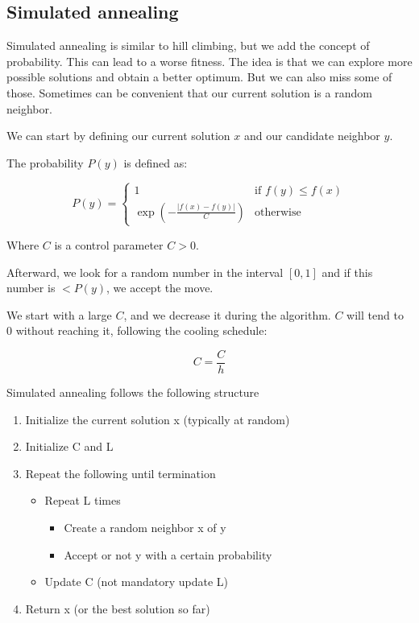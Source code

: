 \subsection{Simulated annealing}

Simulated annealing is similar to hill climbing, but we add the concept of probability. This can lead to a worse fitness. The idea is that we can explore more possible solutions and obtain a better optimum. But we can also miss some of those. Sometimes can be convenient that our current solution is a random neighbor.

\vspace{10pt}

We can start by defining our current solution $x$ and our candidate neighbor $y$.

The probability $P(y)$ is defined as:

\[
P(y) = 
\begin{cases} 
    1 & \text{if } f(y) \leq f(x) \\
    \exp\left(-\frac{|f(x) - f(y)|}{C}\right) & \text{otherwise}
\end{cases}
\]

Where $C$ is a control parameter $C > 0$.

\vspace{10pt}

Afterward, we look for a random number in the interval $[0, 1]$ and if this number is $< P(y)$, we accept the move.

We start with a large $C$, and we decrease it during the algorithm. $C$ will tend to $0$ without reaching it, following the cooling schedule:

\[
C = \frac{C}{h}
\]

Simulated annealing follows the following structure

\begin{enumerate}
    \item Initialize the current solution x (typically at random)
    \item Initialize C and L
    \item Repeat the following until termination
    \begin{itemize}
        \item Repeat L times
        \begin{itemize}
            \item Create a random neighbor x of y
            \item Accept or not y with a certain probability 
        \end{itemize}
    \item Update C (not mandatory update L)
    
    \end{itemize}
    \item Return x (or the best solution so far)
\end{enumerate}

